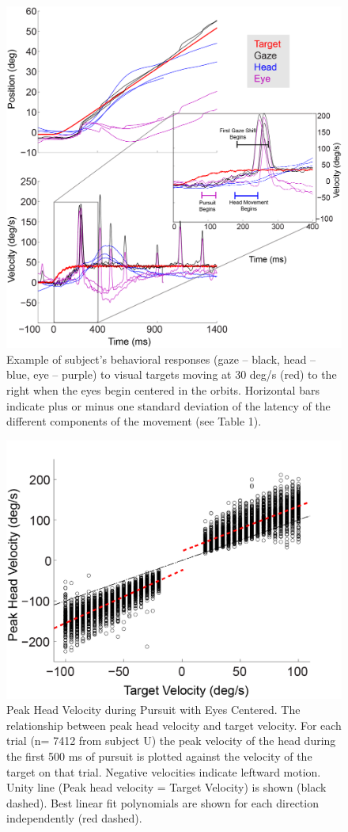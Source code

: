 \documentclass[12pt]{article}
\begin{document}
\begin{figure}[h]
\centering
\includegraphics[width=0.7\linewidth]{./figs/CenterIEP}
\caption[Gaze Pursuit with Eyes Centered]{Example of subject's behavioral responses (gaze – black, head – blue, eye – purple) to visual targets moving at 30 deg/s (red) to the right when the eyes begin centered in the orbits. Horizontal bars indicate plus or minus one standard deviation of the latency of the different components of the movement (see Table 1).
}
\label{fig:CenterIEP}
\end{figure}


\begin{figure}[h]
\centering
\includegraphics[width=0.7\linewidth]{./figs/CenterRegression}
\caption[Peak Head Velocity during Pursuit with Eyes Centered.]{Peak Head Velocity during Pursuit with Eyes Centered. The relationship between peak head velocity and target velocity. For each trial (n= 7412 from subject U) the peak velocity of the head during the first 500 ms of pursuit is plotted against the velocity of the target on that trial. Negative velocities indicate leftward motion. Unity line (Peak head velocity = Target Velocity) is shown (black dashed). Best linear fit polynomials are shown for each direction independently (red dashed).}
\label{fig:CenterRegression}
\end{figure}
\end{document}
